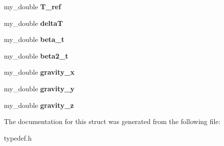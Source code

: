 \begin{DoxyCompactItemize}
\item 
\hypertarget{structprop_a81f3becbea10c04f756320a68665f5a5}{my\-\_\-double {\bfseries T\-\_\-ref}}\label{structprop_a81f3becbea10c04f756320a68665f5a5}

\item 
\hypertarget{structprop_ab9ac15c2bf3253a1142c2e52311a05f5}{my\-\_\-double {\bfseries delta\-T}}\label{structprop_ab9ac15c2bf3253a1142c2e52311a05f5}

\item 
\hypertarget{structprop_a8764cea1e13405338e2ccfe10e838d3e}{my\-\_\-double {\bfseries beta\-\_\-t}}\label{structprop_a8764cea1e13405338e2ccfe10e838d3e}

\item 
\hypertarget{structprop_a5d81e3e829e7faed0ba8718b89d46b01}{my\-\_\-double {\bfseries beta2\-\_\-t}}\label{structprop_a5d81e3e829e7faed0ba8718b89d46b01}

\item 
\hypertarget{structprop_ac22430c6b6ea55851745a632f0adba39}{my\-\_\-double {\bfseries gravity\-\_\-x}}\label{structprop_ac22430c6b6ea55851745a632f0adba39}

\item 
\hypertarget{structprop_aaf7fa0e37096e42e55b803a7b85a8fd3}{my\-\_\-double {\bfseries gravity\-\_\-y}}\label{structprop_aaf7fa0e37096e42e55b803a7b85a8fd3}

\item 
\hypertarget{structprop_ac62d206af1d04c43ef05dd43a1319cbb}{my\-\_\-double {\bfseries gravity\-\_\-z}}\label{structprop_ac62d206af1d04c43ef05dd43a1319cbb}

\end{DoxyCompactItemize}


The documentation for this struct was generated from the following file\-:\begin{DoxyCompactItemize}
\item 
typedef.\-h\end{DoxyCompactItemize}
